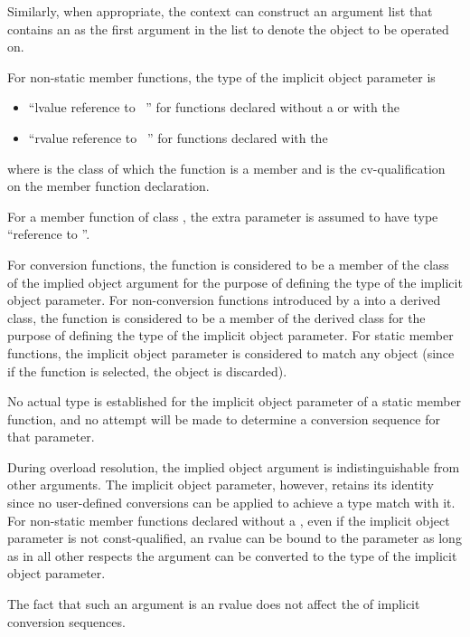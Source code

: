 \pnum
Similarly, when appropriate, the context can construct an
argument list that contains an
as the first argument in the list to denote
the object to be operated on.

\pnum
For non-static member functions, the type of the implicit object
parameter is
\begin{itemize}
\item ``lvalue reference to \cv{}~'' for functions declared
without a  or with the
\tcode{\&} 
\item ``rvalue reference to \cv{}~'' for functions declared with the
\tcode{\&\&} 
\end{itemize}
where
is the class of which the function is a member and
\cv{}
is the cv-qualification on the
member function declaration.
\begin{example}
For a
member
function of class
,
the extra parameter is assumed to have type
``reference to
''.
\end{example}
For conversion functions, the function is considered to be a member of the
class of the implied object argument for the purpose of defining the
type of the implicit object parameter.
For non-conversion functions
introduced by a
into a derived class, the function is
considered to be a member of the derived class for the purpose of defining
the type of the implicit object parameter.
For static member functions, the implicit object parameter is considered
to match any object (since if the function is selected, the object is
discarded).
\begin{note}
No actual type is established for the implicit object parameter
of a static member function, and no attempt will be made to determine a
conversion sequence for that parameter.
\end{note}

\pnum
{}%
During overload resolution, the implied object argument is
indistinguishable from other arguments.
The implicit object
parameter, however, retains its identity since
no user-defined conversions can be applied to achieve a type
match with it.
%
For non-static member functions declared without a ,
even if the implicit object parameter is not const-qualified,
an rvalue can be bound to the parameter
as long as in all other respects the argument can be
converted to the type of the implicit object parameter.
\begin{note}
The fact that such an argument is an rvalue does not
affect the  of implicit conversion sequences.
\end{note}

